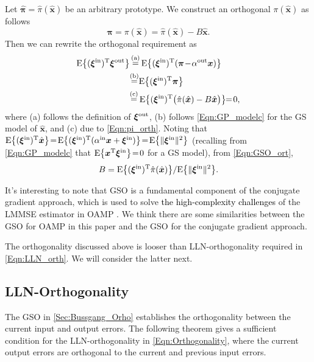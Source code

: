 \documentclass[journal]{IEEEtran}
\newcommand{\mr}{\mathrm}
\newcommand{\BE}{\begin{equation}}
\newcommand{\EE}{\end{equation}}
\newcommand{\BS}{\begin{subequations}}
\newcommand{\ES}{\end{subequations}}
\renewcommand{\bf}{\bm}
\newcommand{\LL}[1]{\textcolor{black}{#1}}
\begin{document}
Let $\hat{\bf{\pi}}=\hat{\pi}(\hat{\bf{x}})$ be an arbitrary prototype. We construct an orthogonal $\pi(\hat{\bf{x}})$ as follows
\BE\label{Eqn:pi_orth}
\bf{\pi}=\pi(\hat{\bf{x}})=\hat{\pi}(\hat{\bf{x}})- B \hat{\bf{x}}.
\EE
Then we can rewrite the orthogonal requirement as
\BS\label{Eqn:GSO_ort}\begin{align}
{\rm E}\big\{(\bf{\xi}^{\mr{in}})^{\rm T}\bf{\xi}^{\rm out}\big\} & \mathop  = \limits^{({\rm{a}})}{\rm E}\big\{(\bf{\xi}^{\mr{in}})^{\rm T}(\bf{\pi}\!-\!\alpha^{\rm out}\bf{x})\big\}  \\ & \!\mathop  = \limits^{({\rm{b}})} \! {\rm E}\big\{(\bf{\xi}^{\mr{in}})^{\rm T}{\bf{\pi}}\big\}  \\ 
&\!\mathop  = \limits^{({\rm{c}})}   {\rm E}\big\{(\bf{\xi}^{\mr{in}})^{\rm T}\big(\hat{\pi}(\hat{\bf{x}})- B \hat{\bf{x}}\big) \big\}\! \!=\!0,
\end{align}\ES 
where  (a) follows the definition of $\bf{\xi}^{\rm out}$, (b) follows \eqref{Eqn:GP_modelc} for the GS model of $\hat{\bf{x}}$, and (c) due to \eqref{Eqn:pi_orth}. Noting that $  {\rm E}\big\{(\bf{\xi}^{\mr{in}})^{\rm T}\hat{\bf{x}}\big\} \! = \! {\rm E}\big\{(\bf{\xi}^{\mr{in}})^{\rm T}{(\alpha^{\mr{in}}\bf{x}+\bf{\xi}^{\mr{in}})} \big\} \!= \! {\rm E}\big\{\|{\bf{\xi}}^{\mr{in}}\|^2\big\} $ (recalling from \eqref{Eqn:GP_modelc} that ${\rm E}\big\{\bf{x}^{\rm T} \bf{\xi}^{\rm in}\big\} \!=\!0$ for a GS model), from \eqref{Eqn:GSO_ort},
\BE\label{Eqn:GSO_B}
B= \mr{E}\big\{ (\bf{\xi}^{\mr{in}})^{\rm T}\hat{\pi}(\hat{\bf{x}})\big\}/\mr{E}\big\{\|{\bf{\xi}}^{\mr{in}}\|^2\big\}.
\EE

 It's interesting to note that GSO is a fundamental component of the conjugate gradient approach, which is used to solve \LL{the high-complexity challenges} of the LMMSE estimator in OAMP \cite{TakeuchiCG2017}. We think there are some similarities between the GSO for OAMP in this paper and the GSO for the conjugate gradient approach.   

The orthogonality discussed above is looser than LLN-orthogonality required in \eqref{Eqn:LLN_orth}. We will consider the latter next.

\subsection{LLN-Orthogonality}
The GSO in \ref{Sec:Bussgang_Orho} establishes the orthogonality between the current input and output errors. The following theorem gives a sufficient condition for the LLN-orthogonality in \eqref{Eqn:Orthogonality}, where the current output errors are orthogonal to the current and previous input errors.
\end{document}
